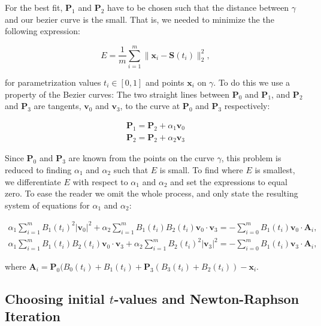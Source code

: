 \documentclass[10pt]{article}
\begin{document}
For the best fit, $\mathbf{P}_1$ and $\mathbf{P}_2$ have to be chosen such that the distance between $\gamma$ and our bezier curve is the small. That is, we needed to minimize the the following expression:

\begin{equation}
E = \frac{1}{m} \sum_{i=1}^{m} \| \mathbf{x}_i - \mathbf{S}(t_i)\|^2_2,
\end{equation}

for parametrization values $t_i \in [ 0,1 ]$ and points $\mathbf{x}_i$ on $\gamma$. To do this we use a property of the Bezier curves: The two straight lines between $\mathbf{P}_0$ and $\mathbf{P}_1$, and $\mathbf{P}_2$ and $\mathbf{P}_3$ are tangents, $\mathbf{v}_0$ and $\mathbf{v}_3$, to the curve at $\mathbf{P}_0$ and $\mathbf{P}_3$ respectively:

\begin{align}
\mathbf{P}_1 = \mathbf{P}_2 + \alpha_1 \mathbf{v}_0 \\
\mathbf{P}_2 = \mathbf{P}_2 + \alpha_2 \mathbf{v}_3
\end{align}

Since $\mathbf{P}_0$ and $\mathbf{P}_3$ are known from the points on the curve $\gamma$, this problem is reduced to finding $\alpha_1$ and $\alpha_2$ such that $E$ is small. To find where $E$ is smallest, we differentiate $E$ with respect to $\alpha_1$ and $\alpha_2$ and set the expressions to equal zero. To ease the reader we omit the whole process, and only state the resulting system of equations for $\alpha_1$ and $\alpha_2$:


\begin{align}
\alpha_1 \sum_{i = 1}^m B_1(t_i)^2 |\mathbf{v}_0|^2 + \alpha_2 \sum_{i = 1}^m B_1(t_i)B_2(t_i)\mathbf{v}_0 \cdot \mathbf{v}_3 
= - \sum_{i = 0}^m B_1(t_i) \mathbf{v}_0 \cdot \mathbf{A}_i, \\
\alpha_1 \sum_{i = 1}^m B_1(t_i)B_2(t_i)\mathbf{v}_0 \cdot \mathbf{v}_3 + \alpha_2 \sum_{i = 1}^m B_2(t_i)^2 |\mathbf{v}_3|^2 
= - \sum_{i = 0}^m B_1(t_i)\mathbf{v}_3 \cdot \mathbf{A}_i,
\end{align}

where $\mathbf{A}_i = \mathbf{P}_0(B_0(t_i) + B_1(t_i) + \mathbf{P}_3(B_3(t_i) + B_2(t_i)) - \mathbf{x}_i$.





\subsection*{Choosing initial $t$-values and Newton-Raphson Iteration}
\end{document}
